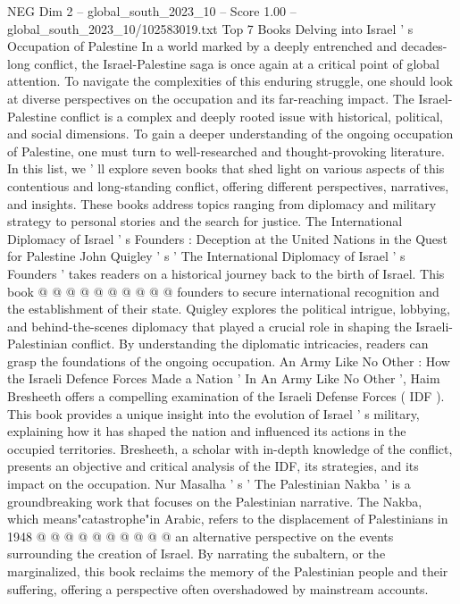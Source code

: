 \begin{textsample}{NEG Dim 2 – global\_south\_2023\_10 – Score 1.00 – global\_south\_2023\_10/102583019.txt}  \label{ex:f2_neg_386}
Top 7 Books Delving into Israel ' s Occupation of Palestine In a world marked by a deeply entrenched and decades-long conflict, the Israel-Palestine saga is once again at a critical point of global attention.
To navigate the complexities of this enduring struggle, one should look at diverse perspectives on the occupation and its far-reaching impact.
The Israel-Palestine conflict is a complex and deeply rooted issue with historical, political, and social dimensions.
To gain a deeper understanding of the ongoing occupation of Palestine, one must turn to well-researched and thought-provoking literature.
In this list, we ' ll explore seven books that shed light on various aspects of this contentious and long-standing conflict, offering different perspectives, narratives, and insights.
These books address topics ranging from diplomacy and military strategy to personal stories and the search for justice.
The International Diplomacy of Israel ' s Founders : Deception at the United Nations in the Quest for Palestine John Quigley ' s ' The International Diplomacy of Israel ' s Founders ' takes readers on a historical journey back to the birth of Israel.
This book @ @ @ @ @ @ @ @ @ @ founders to secure international recognition and the establishment of their state.
Quigley explores the political intrigue, lobbying, and behind-the-scenes diplomacy that played a crucial role in shaping the Israeli-Palestinian conflict.
By understanding the diplomatic intricacies, readers can grasp the foundations of the ongoing occupation.
An Army Like No Other : How the Israeli Defence Forces Made a Nation ' In An Army Like No Other ', Haim Bresheeth offers a compelling examination of the Israeli Defense Forces ( IDF ).
This book provides a unique insight into the evolution of Israel ' s military, explaining how it has shaped the nation and influenced its actions in the occupied territories.
Bresheeth, a scholar with in-depth knowledge of the conflict, presents an objective and critical analysis of the IDF, its strategies, and its impact on the occupation.
Nur Masalha ' s ' The Palestinian Nakba ' is a groundbreaking work that focuses on the Palestinian narrative.
The Nakba, which means"catastrophe"in Arabic, refers to the displacement of Palestinians in 1948 @ @ @ @ @ @ @ @ @ @ an alternative perspective on the events surrounding the creation of Israel.
By narrating the subaltern, or the marginalized, this book reclaims the memory of the Palestinian people and their suffering, offering a perspective often overshadowed by mainstream accounts.

\end{textsample}
